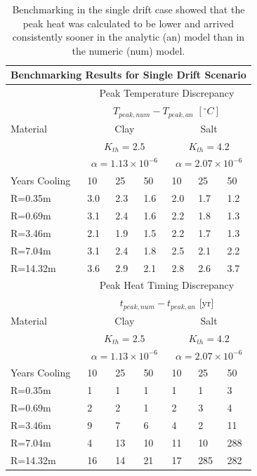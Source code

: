 \documentclass{article}
\begin{document}
\begin{table}
  \centering
  \footnotesize{
  \begin{tabular}{|l|l|l|l|l|l|l|}
    \multicolumn{7}{c}{\textbf{Benchmarking Results for Single Drift 
    Scenario}}\\
    \hline
    & \multicolumn{6}{|c|}{Peak Temperature Discrepancy}\\ 
    & \multicolumn{6}{|c|}{$T_{peak,num}-T_{peak,an}$ $[^{\circ}C]$} \\
    \hline
    Material & \multicolumn{3}{|c|}{Clay} & \multicolumn{3}{|c|}{Salt}\\ & 
    \multicolumn{3}{|c|}{$K_{th}=2.5$} & \multicolumn{3}{|c|}{$K_{th}=4.2$}\\ & 
    \multicolumn{3}{|c|}{$\alpha=1.13\times10^{-6}$} & 
    \multicolumn{3}{|c|}{$\alpha=2.07\times10^{-6}$}\\ 
    \hline
    Years Cooling  & 10     & 25      & 50      & 10     & 25     & 50\\
    \hline
     R=0.35m  & 3.0   & 2.3     & 1.6    & 2.0   & 1.7   & 1.2\\
     R=0.69m  & 3.1   & 2.4    & 1.6    & 2.2    & 1.8   & 1.3\\
     R=3.46m  & 2.1   & 1.9    & 1.5    & 2.2   & 1.7    & 1.3\\
     R=7.04m  & 3.1   & 2.4     & 1.8    & 2.5   & 2.1   & 2.2\\
     R=14.32m & 3.6   & 2.9    & 2.1    & 2.8   & 2.6   & 3.7\\
    \hline
    & \multicolumn{6}{|c|}{Peak Heat Timing Discrepancy}\\ 
    & \multicolumn{6}{|c|}{ $t_{peak,num}-t_{peak,an}$ [yr]} \\
    \hline
    Material & \multicolumn{3}{|c|}{Clay} & \multicolumn{3}{|c|}{Salt}\\ & 
    \multicolumn{3}{|c|}{$K_{th}=2.5$} & \multicolumn{3}{|c|}{$K_{th}=4.2$}\\ & 
    \multicolumn{3}{|c|}{$\alpha=1.13\times10^{-6}$} & 
    \multicolumn{3}{|c|}{$\alpha=2.07\times10^{-6}$}\\ \hline
    Years Cooling  & 10     & 25      & 50      & 10     & 25     & 50\\
    \hline
     R=0.35m  & 1    & 1       & 1   & 1      & 1      & 3\\
     R=0.69m  & 2    & 2       & 1    & 2      & 3      & 4\\
     R=3.46m  & 9    & 7       & 6    & 4      & 2      & 11\\
     R=7.04m  & 4    & 13      & 10    & 11     & 10     & 288\\
     R=14.32m & 16   & 14      & 21   & 17     & 285    & 282\\
    \hline
  \end{tabular}
  \caption{Benchmarking in the single drift case showed that the peak heat was 
  calculated to be lower and arrived consistently sooner in the analytic (an) 
  model than in the numeric (num) model. 
  }
  \label{tab:benchSingle}
  }
\end{table}
\end{document}
